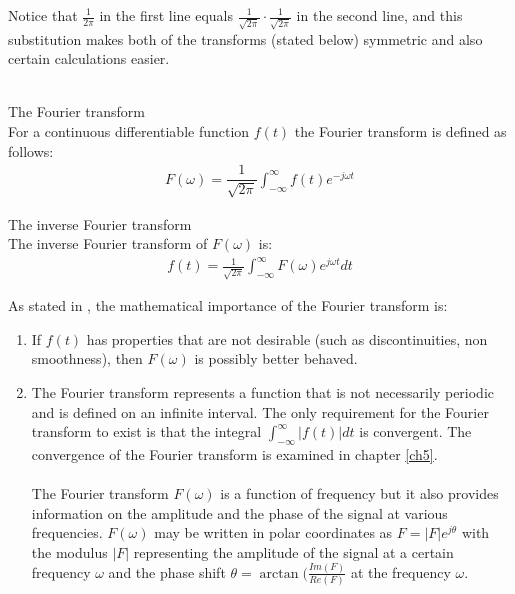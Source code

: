 \noindent
Notice that $\frac{1}{2\pi}$ in the first line equals $\frac{1}{\sqrt{2\pi}} \cdot \frac{1}{\sqrt{2\pi}}$ in the second line, and this substitution makes both of the transforms (stated below) symmetric and also certain calculations easier. \cite{Page 10, FourierTrans}
\\ \\
\begin{definition}{The Fourier transform}
\\
For a continuous differentiable function $f(t)$ the Fourier transform is defined as follows:
\begin{align*}
F(\omega) = \dfrac{1}{\sqrt{2\pi}} \int_{-\infty}^\infty f(t) e^{-j \omega t}
\end{align*}
\end{definition}

\begin{definition}{The inverse Fourier transform} \label{InverseFourier}
\\
The inverse Fourier transform of $F(\omega)$ is:
\begin{align*}
f(t) = \frac{1}{\sqrt{2\pi}} \int_{-\infty}^\infty F(\omega) e^{j \omega t} dt
\end{align*}
\end{definition}

As stated in \cite{FourierTrans}, the mathematical importance of the Fourier transform is:
\begin{enumerate}
\item If $f(t)$ has properties that are not desirable (such as discontinuities, non smoothness), then $F(\omega)$ is possibly better behaved.
\item The Fourier transform represents a function that is not necessarily periodic and is defined on an infinite interval. The only requirement for the Fourier transform to exist is that the integral $\int_{-\infty}^\infty |f(t)| dt$ is convergent. The convergence of the Fourier transform is examined in chapter \ref{ch5}.
\\ \\
The Fourier transform $F(\omega)$ is a function of frequency but it also provides information on the amplitude and the phase of the signal at various frequencies. $F(\omega)$ may be written in polar coordinates as $F = |F|e^{j\theta}$ with the modulus $|F|$ representing the amplitude of the signal at a certain frequency $\omega$ and the phase shift $\theta = \arctan(\frac{Im(F)}{Re(F)}$ at the frequency $\omega$.
\end{enumerate}

